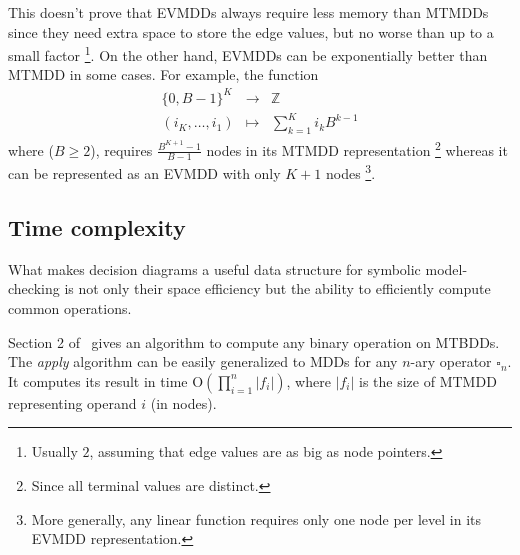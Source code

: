 \documentclass[nocover]             %
{NASA}                       %
\renewcommand{\O}[1]{\mathrm{O}\left(#1\right)}
\newcommand{\Z}{\mathbb{Z}}
\begin{document}
This doesn't prove that EVMDDs always require less memory than MTMDDs since
they need extra space to store the edge values, but no worse than up to a small factor
\footnote{Usually $2$, assuming that edge values are as
big as node pointers.}. On the other hand, EVMDDs can be exponentially better than
MTMDD in some cases. For example, the function
$$
\begin{array}{rcl}
  \{0, B-1\}^K&\rightarrow&\Z\\
  (i_K,\ldots, i_1)&\mapsto&\sum_{k=1}^{K} i_k B^{k-1}
\end{array}
$$
where ($B \geq 2$),
requires $\frac{B^{K+1}-1}{B-1}$ nodes in its MTMDD representation%
\footnote{Since all terminal values are distinct.}
whereas it can be represented as an EVMDD with only $K+1$ nodes%
\footnote{More generally, any linear function requires only
one node per level in its EVMDD representation.}.

\subsection{Time complexity%
  \label{subsection-time-complexity}}

What makes decision diagrams a useful data structure
for symbolic model-checking is not only their space efficiency
but the ability to efficiently compute common operations.

Section 2 of~\cite{Clarke1995} gives an algorithm to compute any
binary operation on MTBDDs. The \emph{apply} algorithm can be
easily generalized to MDDs for any
$n$-ary operator $\square_n$. It computes its result in time
$\O{\prod_{i=1}^n |f_i|}$, where $|f_i|$ is the size of MTMDD representing
operand $i$ (in nodes).
\end{document}
